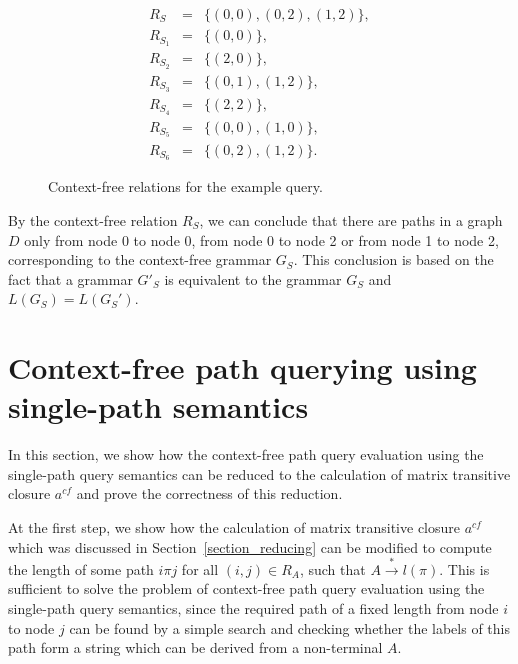 \documentclass[runningheads,a4paper]{llncs}
\begin{document}
\begin{figure}[h]
	\begin{eqnarray*}
		R_S&=&\{(0,0),(0,2),(1,2)\},\\
		R_{S_1}&=&\{(0,0)\},\\
		R_{S_2}&=&\{(2,0)\}, \\
		R_{S_3}&=&\{(0,1), (1,2)\}, \\
		R_{S_4}&=&\{(2,2)\}, \\
		R_{S_5}&=&\{(0,0), (1,0)\}, \\
		R_{S_6}&=&\{(0,2), (1,2)\}.
	\end{eqnarray*}
	\caption{Context-free relations for the example query.}
	\label{ExampleQueryCFRelations}
\end{figure}

By the context-free relation $R_S$, we can conclude that there are paths in a graph $D$ only from node 0 to node 0, from node 0 to node 2 or from node 1 to node 2, corresponding to the context-free grammar $G_S$. This conclusion is based on the fact that a grammar $G'_S$ is equivalent to the grammar $G_S$ and $L(G_S) = L(G_S')$.

\section{Context-free path querying using single-path semantics}%
In this section, we show how the context-free path query evaluation using the single-path query semantics can be reduced to the calculation of matrix transitive closure $a^{cf}$ and prove the correctness of this reduction.

At the first step, we show how the calculation of matrix transitive closure $a^{cf}$ which was discussed in Section~\ref{section_reducing} can be modified to compute the length of some path $i \pi j$ for all $(i,j) \in R_A$, such that $A \xrightarrow{*} l(\pi)$. This is sufficient to solve the problem of context-free path query evaluation using the single-path query semantics, since the required path of a fixed length from node $i$ to node $j$ can be found by a simple search and checking whether the labels of this path form a string which can be derived from a non-terminal $A$.
\end{document}
